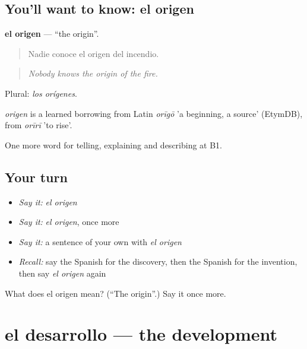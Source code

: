 \subsection*{You'll want to know: el origen}
\textbf{el origen} — \textquotedblleft{}the origin\textquotedblright{}.

\begin{quote}
Nadie conoce el origen del incendio.
\end{quote}

\begin{quote}
\emph{Nobody knows the origin of the fire.}
\end{quote}

Plural: \emph{los orígenes}.

\begin{cousinweb}
\emph{origen} is a learned borrowing from Latin \emph{orīgō} 'a beginning, a source' (EtymDB), from \emph{orīrī} 'to rise'.
\end{cousinweb}

\begin{grammarlens}[title={What you've built}]
One more word for telling, explaining and describing at B1.
\end{grammarlens}

\subsection*{Your turn}
\begin{itemize}
\raggedright
  \item \emph{Say it:} \emph{el origen}
  \item \emph{Say it:} \emph{el origen}, once more
  \item \emph{Say it:} a sentence of your own with \emph{el origen}
  \item \emph{Recall:} say the Spanish for the discovery, then the Spanish for the invention, then say \emph{el origen} again
\end{itemize}

\begin{tcolorbox}[breakable,colback=teal!4,colframe=teal!35!black,title={Before you move on}]
What does el origen mean? (\textquotedblleft{}The origin\textquotedblright{}.) Say it once more.
\end{tcolorbox}
\section[el desarrollo]{el desarrollo — the development}

